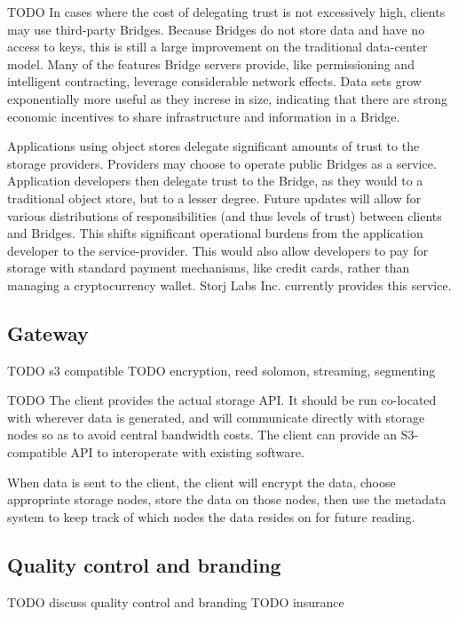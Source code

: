 \documentclass[a4paper,10pt]{article} \usepackage[utf8]{inputenc}
\newcommand{\todo}[1]{{\color{red} TODO #1 }}
\begin{document}
\todo{ In cases where the cost of delegating trust is not excessively high,
clients may use third-party Bridges. Because Bridges do not store data and have
no access to keys, this is still a large improvement on the traditional
data-center model. Many of the features Bridge servers provide, like
permissioning and intelligent contracting, leverage considerable network
effects. Data sets grow exponentially more useful as they increse in size,
indicating that there are strong economic incentives to share infrastructure and
information in a Bridge.

Applications using object stores delegate significant amounts of trust to the
storage providers. Providers may choose to operate public Bridges as a service.
Application developers then delegate trust to the Bridge, as they would to a
traditional object store, but to a lesser degree. Future updates will allow for
various distributions of responsibilities (and thus levels of trust) between
clients and Bridges. This shifts significant operational burdens from the
application developer to the service-provider. This would also allow developers
to pay for storage with standard payment mechanisms, like credit cards, rather
than managing a cryptocurrency wallet. Storj Labs Inc. currently provides this
service. }

\subsection{Gateway}

\todo{s3 compatible}
\todo{encryption, reed solomon, streaming, segmenting}

\todo{ The client provides the actual storage API. It should be run co-located
with wherever data is generated, and will communicate directly with storage
nodes so as to avoid central bandwidth costs. The client can provide an
S3-compatible API to interoperate with existing software.

When data is sent to the client, the client will encrypt the data, choose
appropriate storage nodes, store the data on those nodes, then use the metadata
system to keep track of which nodes the data resides on for future reading. }

\subsection{Quality control and branding}

\todo{discuss quality control and branding}
\todo{insurance}
\end{document}
